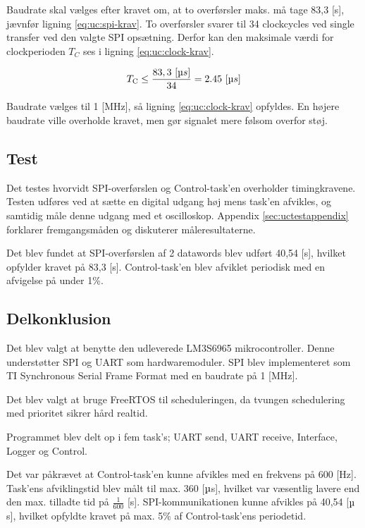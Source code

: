 Baudrate skal vælges efter kravet om, at to overførsler maks. må tage 83,3 [\micro s], jævnfør 
ligning \ref{eq:uc:spi-krav}. To overførsler svarer til 34 clockcycles ved 
single transfer ved den valgte SPI opsætning. Derfor kan den maksimale værdi for 
clockperioden  $T_C$ ses i ligning \ref{eq:uc:clock-krav}.

\begin{equation}
	T_{\text{C}} \leq \frac{83,3~[\micro s]}{34} = 2.45~[\micro s]
	\label{eq:uc:clock-krav}
\end{equation}

Baudrate vælges til 1 [MHz], så ligning \ref{eq:uc:clock-krav} opfyldes. En 
højere baudrate ville overholde kravet, men gør signalet mere følsom overfor støj.

\subsection{Test} 
Det testes hvorvidt SPI-overførslen og Control-task'en overholder timingkravene. 
Testen udføres ved at sætte en digital udgang høj mens task'en afvikles, og samtidig måle denne udgang med et oscilloskop. 
Appendix \ref{sec:uctestappendix} forklarer fremgangsmåden og diskuterer måleresultaterne. 


Det blev fundet at SPI-overførslen af 2 datawords blev udført 40,54 [\micro s], hvilket opfylder kravet på 83,3 [\micro s]. 
Control-task'en blev afviklet periodisk med en afvigelse på under 1\%. 


\subsection{Delkonklusion}
Det blev valgt at benytte den udleverede LM3S6965 mikrocontroller.
Denne understøtter SPI og UART som hardwaremoduler. 
SPI blev implementeret som TI Synchronous Serial Frame Format med en baudrate på 
1 [MHz].

Det blev valgt at bruge FreeRTOS til scheduleringen,
da tvungen schedulering med prioritet sikrer hård realtid. 

Programmet blev delt op i fem task's; UART send, UART receive, Interface, Logger og Control. 

Det var påkrævet at Control-task'en kunne afvikles med en frekvens på 600 [Hz]. 
Task'ens afviklingstid blev målt til max. 360 [\(\micro\)s], hvilket var væsentlig lavere end den max. tilladte tid på \(\frac{1}{600}\) [s]. 
SPI-kommunikationen kunne afvikles på 40,54 [\(\micro\)s], hvilket opfyldte kravet på max. 5\% af Control-task'ens periodetid. 

